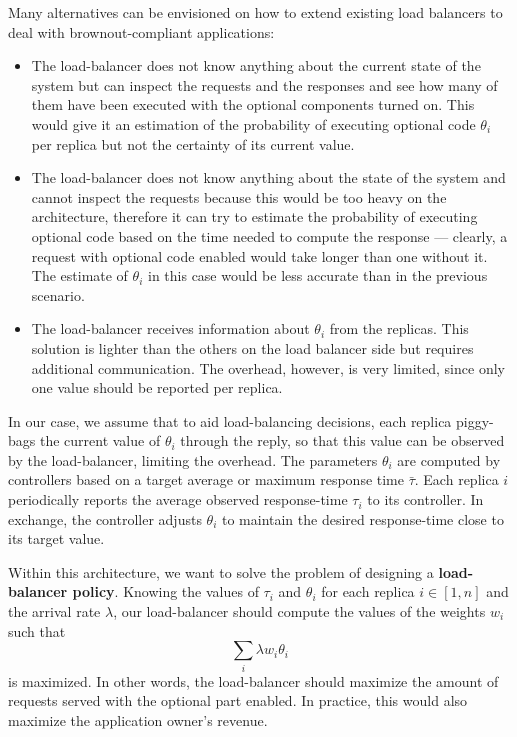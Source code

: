 Many alternatives can be envisioned on how to extend existing load
balancers to deal with brownout-compliant applications:
\begin{itemize}
\item The load-balancer does not know anything about the current state
  of the system but can inspect the requests and the responses and see
  how many of them have been executed with the optional components
  turned on. This would give it an estimation of the probability of
  executing optional code $\theta_i$ per replica but not the certainty
  of its current value.
\item The load-balancer does not know anything about the state of the
  system and cannot inspect the requests because this would be too
  heavy on the architecture, therefore it can try to estimate the
  probability of executing optional code based on the time needed to
  compute the response --- clearly, a request with optional code
  enabled would take longer than one without it. The estimate of
  $\theta_i$ in this case would be less accurate than in the previous
  scenario.
\item The load-balancer receives information about $\theta_i$ from the
  replicas. This solution is lighter than the others on the load
  balancer side but requires additional communication. The overhead,
  however, is very limited, since only one value should be reported
  per replica.
\end{itemize}

In our case, we assume that to aid load-balancing decisions, each
replica piggy-bags the current value of $\theta_i$ through the reply,
so that this value can be observed by the load-balancer, limiting the
overhead. The parameters $\theta_i$ are computed by controllers based
on a target average or maximum response time $\bar{\tau}$. Each
replica $i$ periodically reports the average observed response-time
$\tau_i$ to its controller. In exchange, the controller adjusts
$\theta_i$ to maintain the desired response-time close to its target
value.

Within this architecture, we want to solve the problem of designing a
{\bf load-balancer policy}. Knowing the values of $\tau_i$ and
$\theta_i$ for each replica $i \in [1, n]$ and the arrival rate
$\lambda$, our load-balancer should compute the values of the weights
$w_i$ such that
\begin{equation}
\sum_{i} \lambda w_i \theta_i
\end{equation}
is maximized. In other words, the load-balancer should maximize the
amount of requests served with the optional part enabled. In practice,
this would also maximize the application owner's revenue.

